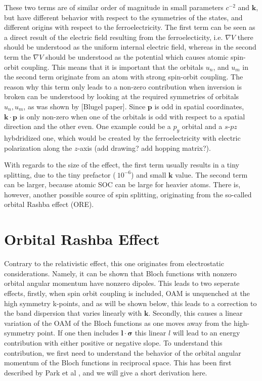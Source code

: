 These two terms are of similar order of magnitude in small parameters $c^{-2}$ and $\bm{k}$, but have different behavior with respect to the symmetries of the states, and different origins with respect to the ferroelectricity. The first term can be seen as a direct result of the electric field resulting from the ferroelecticity, i.e. $\nabla V$ there should be understood as the uniform internal electric field, whereas in the second term the $\nabla V$ should be understood as the potential which causes atomic spin-orbit coupling. This means that it is important that the orbitals $u_n$, and $u_m$ in the second term originate from an atom with strong spin-orbit coupling. The reason why this term only leads to a non-zero contribution when inversion is broken can be understood by looking at the required symmetries of orbitals $u_n, u_m$, as was shown by [Blugel paper]. Since $\bm{p}$ is odd in spatial coordinates, $\bm{k} \cdot \bm{p}$ is only non-zero when one of the orbitals is odd with respect to a spatial direction and the other even. One example could be a $p_y$ orbital and a $s$-$pz$ hybdridized one, which would be created by the ferroelectricity with electric polarization along the $z$-axis (add drawing? add hopping matrix?).

With regards to the size of the effect, the first term usually results in a tiny splitting, due to the tiny prefactor ($~10^{-6}$) and small $\bm{k}$ value. The second term can be larger, because atomic SOC can be large for heavier atoms. There is, however, another possible source of spin splitting, originating from the so-called orbital Rashba effect (ORE).

\section{Orbital Rashba Effect}
Contrary to the relativistic effect, this one originates from electrostatic considerations. Namely, it can be shown that Bloch functions with nonzero orbital angular momentum have nonzero dipoles. This leads to two seperate effects, firstly, when spin orbit coupling is included, OAM is unquenched at the high symmetry k-points, and as will be shown below, this leads to a correction to the band dispersion that varies linearly with $\bm{k}$. Secondly, this causes a linear variation of the OAM of the Bloch functions as one moves away from the high-symmetry point. If one then includes $\bm{l}\cdot\bm{\sigma}$ this linear $l$ will lead to an energy contribution with either positive or negative slope.
To understand this contribution, we first need to understand the behavior of the orbital angular momentum of the Bloch functions in reciprocal space. This has been first described by Park et al \cite{Park2011}, and we will give a short derivation here.

